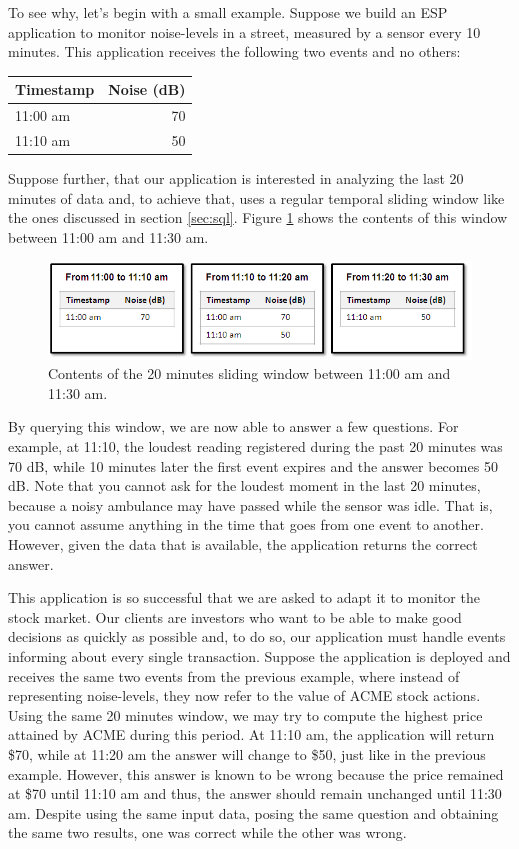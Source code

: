 \documentclass[a4,11pt]{report}
\begin{document}
To see why, let's begin with a small example. Suppose we build an ESP
application to monitor noise-levels in a street, measured by a sensor
every 10 minutes. This application receives the following two events
and no others:

\begin{tabular}{ |l|r| }
  \hline
  Timestamp & Noise (dB) \\
  \hline
  11:00 am & 70 \\
  11:10 am & 50 \\
  \hline
\end{tabular}

Suppose further, that our application is interested in analyzing the
last 20 minutes of data and, to achieve that, uses a regular temporal
sliding window like the ones discussed in section
\ref{sec:sql}. Figure \ref{fig:window-contents} shows the contents of
this window between 11:00 am and 11:30 am.

\begin{figure}[htbp]
  \includegraphics[width=\textwidth]{window-contents.png}
  \caption{Contents of the 20 minutes sliding window between 11:00 am
    and 11:30 am.}
  \label{fig:window-contents}
\end{figure}

By querying this window, we are now able to answer a few
questions. For example, at 11:10, the loudest reading registered
during the past 20 minutes was 70 dB, while 10 minutes later the
first event expires and the answer becomes 50 dB. Note that you cannot
ask for the loudest moment in the last 20 minutes, because a noisy
ambulance may have passed while the sensor was idle. That is, you
cannot assume anything in the time that goes from one event to
another. However, given the data that is available, the application
returns the correct answer.

This application is so successful that we are asked to adapt it to
monitor the stock market. Our clients are investors who want to be
able to make good decisions as quickly as possible and, to do so, our
application must handle events informing about every single
transaction. Suppose the application is deployed and receives the same
two events from the previous example, where instead of representing
noise-levels, they now refer to the value of ACME stock actions. Using
the same 20 minutes window, we may try to compute the highest price
attained by ACME during this period. At 11:10 am, the application will
return \$70, while at 11:20 am the answer will change to \$50, just
like in the previous example. However, this answer is known to be
wrong because the price remained at \$70 until 11:10 am and thus, the
answer should remain unchanged until 11:30 am. Despite using the same
input data, posing the same question and obtaining the same two
results, one was correct while the other was wrong.
\end{document}
